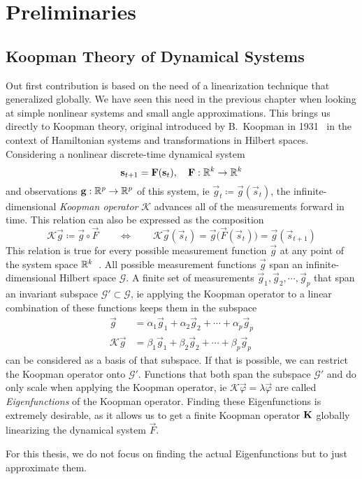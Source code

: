 \chapter{Preliminaries}
\label{c:preliminaries}



\section{Koopman Theory of Dynamical Systems}

	Out first contribution is based on the need of a linearization technique that generalized globally. We have seen this need in the previous chapter when looking at simple nonlinear systems and small angle approximations. This brings us directly to Koopman theory, original introduced by B.~Koopman in 1931~\cite{koopmanHamiltonianSystemsTransformation1931} in the context of Hamiltonian systems and transformations in Hilbert spaces. Considering a nonlinear discrete-time dynamical system
	\begin{equation*}
		\boldsymbol{\mathrm{s}}_{t + 1} = \boldsymbol{\mathrm{F}}(\boldsymbol{\mathrm{s}}_t),\quad \boldsymbol{\mathrm{F}} : \mathbb{R}^k \to \mathbb{R}^k
	\end{equation*}
	and observations \( \boldsymbol{\mathrm{g}} : \mathbb{R}^p \to \mathbb{R}^p \) of this system, \ac{ie} \( \vec{g}_t \coloneqq \vec{g}(\vec{s}_t) \), the infinite-dimensional \emph{Koopman operator} \(\mathcal{K}\) advances all of the measurements forward in time. This relation can also be expressed as the composition
	\begin{equation*}
		\mathcal{K} \vec{g} \coloneqq \vec{g} \circ \vec{F} \qquad\iff\qquad \mathcal{K} \vec{g}(\vec{s}_t) = \vec{g}\big( \vec{F}(\vec{s}_t) \big) = \vec{g}(\vec{s}_{t + 1})
	\end{equation*}
	This relation is true for every possible measurement function \( \vec{g} \) at any point of the system space \( \mathbb{R}^k \)~\cite{bruntonKoopmanInvariantSubspaces2016}. All possible measurement functions \( \vec{g} \) span an infinite-dimensional Hilbert space \( \mathcal{G} \). A finite set of measurements \( \vec{g}_1, \vec{g}_2, \cdots, \vec{g}_p \) that span an invariant subspace \( \mathcal{G}' \subset \mathcal{G} \), \ac{ie} applying the Koopman operator to a linear combination of these functions keeps them in the subspace
	\begin{align*}
		\vec{g} &= \alpha_1 \vec{g}_1 + \alpha_2 \vec{g}_2 + \cdots + \alpha_p \vec{g}_p \\
		\mathcal{K} \vec{g} &= \beta_1 \vec{g}_1 + \beta_2 \vec{g}_2 + \cdots + \beta_p \vec{g}_p
	\end{align*}
	can be considered as a basis of that subspace. If that is possible, we can restrict the Koopman operator onto \( \mathcal{G}' \). Functions that both span the subspace \(\mathcal{G}'\) and do only scale when applying the Koopman operator, \ac{ie} \( \mathcal{K} \vec{\varphi} = \lambda \vec{\varphi} \) are called \emph{Eigenfunctions} of the Koopman operator. Finding these Eigenfunctions is extremely desirable, as it allows us to get a finite Koopman operator \( \boldsymbol{\mathrm{K}} \) globally linearizing the dynamical system \( \vec{F} \).

	For this thesis, we do not focus on finding the actual Eigenfunctions but to just approximate them.
